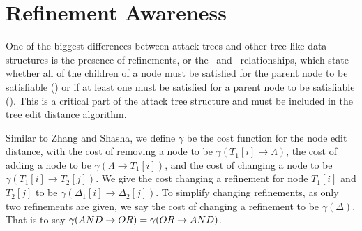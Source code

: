 \section{Refinement Awareness}
\label{sec:refinement-awareness}

One of the biggest differences between attack trees and other tree-like data structures is the presence of refinements, or the \AND\ and \OR\ relationships, which state whether all of the children of a node must be satisfied for the parent node to be satisfiable (\AND) or if at least one must be satisfied for a parent node to be satisfiable (\OR). This is a critical part of the attack tree structure and must be included in the tree edit distance algorithm.




\begin{definition}\label{def:cost-function}
Similar to Zhang and Shasha, we define $\gamma$ be the cost function for the node edit distance, with the cost of removing a node to be $\gamma(T_1[i] \rightarrow {\Lambda})$, the cost of adding a node to be $\gamma({\Lambda}\rightarrow T_1[i])$, and the cost of changing a node to be $\gamma(T_1[i] \rightarrow T_2[j])$. We give the cost changing a refinement for node  $T_1[i]$ and $T_2[j]$ to be $\gamma(\Delta_1[i] \rightarrow \Delta_2[j])$. To simplify changing refinements, as only two refinements are given, we say the cost of changing a refinement to be $\gamma(\Delta)$. That is to say $\gamma(AND \rightarrow OR) = \gamma(OR \rightarrow AND)$.
\end{definition}



